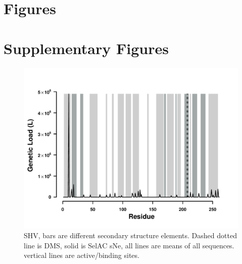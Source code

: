 \documentclass[12pt]{article}
\begin{document}



\section*{Figures}



\beginsupplement
\section*{Supplementary Figures}


\begin{figure}[H]
     \centering
	\includegraphics[width=\textwidth]{img/GL_slide_SHV2016}
	\caption{SHV, bars are different secondary structure elements. Dashed dotted line is DMS, solid is SelAC sNe, all lines are means of all sequences. vertical lines are active/binding sites.}
	\label{fig:shv2016_sse}
\end{figure}
\end{document}
